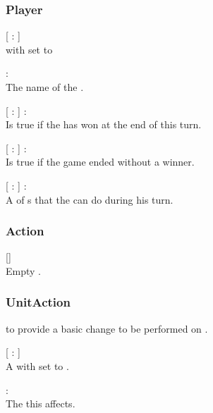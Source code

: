 \subsubsection{Player}
\begin{dlist}
  \item {}[  :  ]\\
   with  set to 
  
  \item {} : \\
  The name of the .
  
  \item {}[  :  ] : \\
  Is true if the  has won at the end of this turn.
  
  \item {}[  :  ] : \\
  Is true if the game ended without a winner.
  
  \item {}[  :  ] : \\
  A  of s that the  can do during his turn.
\end{dlist}

\subsubsection{Action}
\begin{dlist}
  \item {}[]\\
  Empty .
\end{dlist}

\subsubsection{UnitAction}
   to provide a basic change to be performed on .

\begin{dlist}
  \item {}[  :  ]\\
  A  with  set to .
  
  \item {} : \\
  The  this  affects.
\end{dlist}

